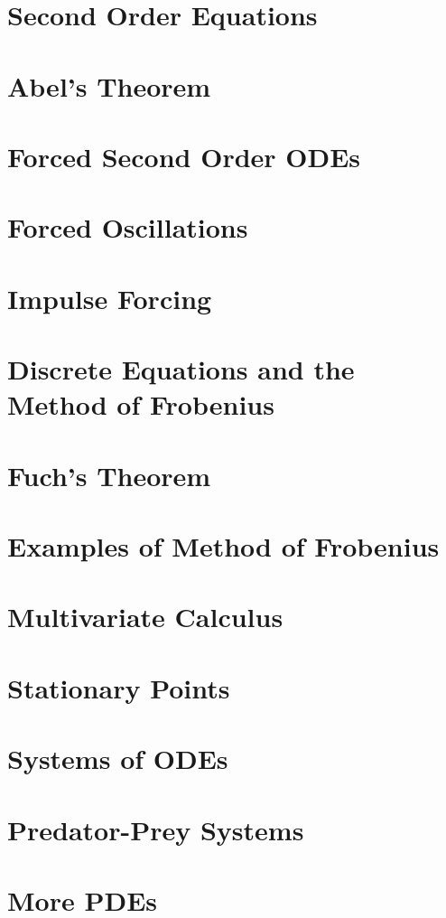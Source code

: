 \documentclass{article}
\begin{document}
\section{Second Order Equations}

\section{Abel's Theorem}

\section{Forced Second Order ODEs}

\section{Forced Oscillations}

\section{Impulse Forcing}

\section{Discrete Equations and the Method of Frobenius}

\section{Fuch's Theorem}

\section{Examples of Method of Frobenius}

\section{Multivariate Calculus}

\section{Stationary Points}

\section{Systems of ODEs}

\section{Predator-Prey Systems}

\section{More PDEs}

\end{document}
